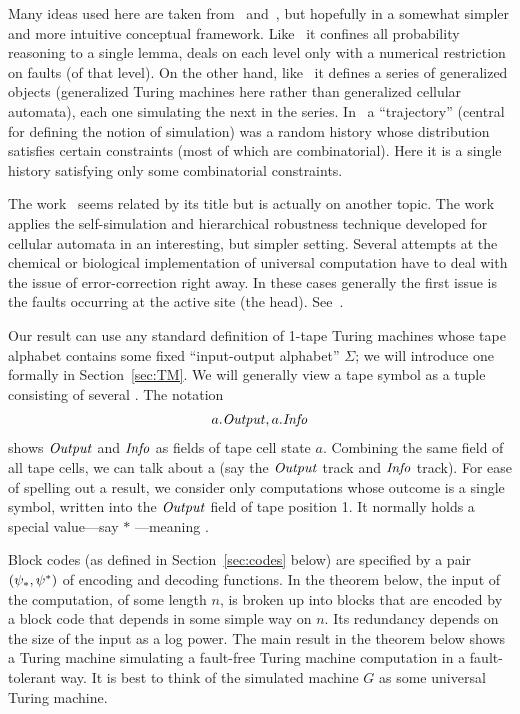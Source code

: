 \documentclass[11pt]{memoir}
\theoremstyle{definition} %
\newcommand{\fld}[1]{\ensuremath{\textit{#1\/}}}
\newcommand{\Info}{\fld{Info}}
\newcommand{\Output}{\fld{Output}}
\begin{document}
Many ideas used here are taken from~\cite{Gacs1dim86} and~\cite{GacsSorg01},
but hopefully in a somewhat simpler and more intuitive conceptual framework.
Like~\cite{Gacs1dim86} it confines all probability reasoning to a single lemma,
deals on each level only with a numerical restriction on faults (of that level).
On the other hand, like~\cite{GacsSorg01} it defines a series of generalized objects
(generalized Turing machines here rather than generalized cellular automata),
each one simulating the next in the series.
In~\cite{GacsSorg01} a ``trajectory'' (central for defining the notion of simulation) was
a random history whose distribution satisfies certain constraints (most of which are combinatorial).
Here it is a single history satisfying only some combinatorial constraints.

The work~\cite{AsarinCollins2005} seems related by its title 
but is actually on another topic.
The work~\cite{DurandRomashShenTiling12} applies the self-simulation and
hierarchical robustness technique developed for cellular automata in an interesting, but
simpler setting.
Several attempts at the chemical or
biological implementation of universal computation have to deal with
the issue of error-correction right away.
In these cases generally the first issue is the faults occurring at the active site (the head).
See~\cite{BennettThermodynComp1982,QianSoloveichikWinfree2011}.

Our result can use any standard definition of 1-tape Turing machines whose tape alphabet
contains some fixed ``input-output alphabet'' \( \Sigma \); we will
introduce one formally in Section~\ref{sec:TM}.
We will generally view a tape symbol as a tuple consisting of several .
The notation
\begin{align*}
   a.\Output, a.\Info
 \end{align*}
 shows \( \Output \) and \( \Info \) as fields of tape cell state \( a \).
Combining the same field of all tape cells, we can talk about a 
(say the \( \Output \) track and \( \Info \) track).
For ease of spelling out a result, we consider only computations whose outcome
is a single symbol, written into the \( \Output \) field of tape position 1.
It normally holds a special value---say \( * \) ---meaning .

 Block codes (as defined in Section~\ref{sec:codes} below) are specified by a pair \( (\psi_{*},\psi^{*}) \)
of encoding and decoding functions.
In the theorem below, the input of the computation, of some length \( n \), is broken up into blocks
that are encoded by a block code that depends in some simple way on \( n \).
Its redundancy depends on the size of the input as a log power.
The main result in the theorem below shows a Turing machine simulating a fault-free
Turing machine computation in a fault-tolerant way.
It is best to think of the simulated machine \( G \) as some universal Turing machine.
\end{document}
